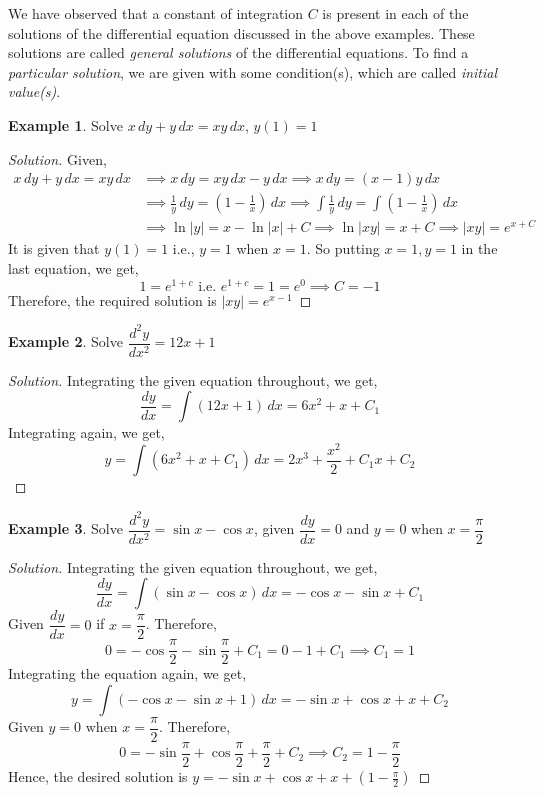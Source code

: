 \documentclass{book}
\theoremstyle{definition}
\newtheorem{example}{Example}[section]
\newenvironment{solution}
    {\begin{proof}[Solution]}
    {\end{proof}}
\begin{document}
We have observed that a constant of integration $C$ is present in each of the solutions of the differential equation discussed in the above examples. These solutions are called \textit{general solutions} of the differential equations. To find a \textit{particular solution}, we are given with some condition(s), which are called \textit{initial value(s)}.


\begin{example}
Solve $x\,dy+y\,dx=xy\,dx$, $y(1)=1$
\end{example}

\begin{solution}
Given,
\begin{align*}
    x\,dy+y\,dx=xy\,dx &\implies x\,dy=xy\,dx-y\,dx \implies x\,dy=(x-1)y\,dx \\
    &\implies \frac{1}{y}\,dy=(1-\frac{1}{x})\,dx \implies\displaystyle\int\frac{1}{y}\,dy=\displaystyle\int(1-\frac{1}{x})\,dx \\
    &\implies \ln |y|=x-\ln|x|+C \implies \ln |xy|=x+C \implies |xy|=e^{x+C}
\end{align*}    
It is given that $y(1)=1$ i.e., $y=1$ when $x=1$. So putting $x=1, y=1$ in the last equation, we get,
\[
1=e^{1+c} \text{ i.e. } e^{1+c}=1=e^0 \implies C = -1
\]
Therefore, the required solution is $|xy|=e^{x-1}$
\end{solution}



\begin{example}
Solve $\dfrac{d^2y}{dx^2}=12x+1$
\end{example}

\begin{solution}
Integrating the given equation throughout, we get,
\[
\frac{dy}{dx}=\int(12x+1)\,dx=6x^2+x+C_1
\]
Integrating again, we get, 
\[
y=\int(6x^2+x+C_1)\,dx=2x^3+\frac{x^2}{2}+C_1x+C_2
\]
\end{solution}

\begin{example}
Solve $\dfrac{d^2y}{dx^2}=\sin x-\cos x$, given $\dfrac{dy}{dx}=0$ and $y=0$ when $x=\dfrac{\pi}{2}$
\end{example}

\begin{solution}
Integrating the given equation throughout, we get,
\[
\frac{dy}{dx}=\int(\sin x-\cos x)\,dx=-\cos x-\sin x+C_1
\]
Given $\dfrac{dy}{dx}=0$ if $x=\dfrac{\pi}{2}$. Therefore, 
\[
0=-\cos \frac{\pi}{2}-\sin \frac{\pi}{2}+C_1 = 0-1+C_1 \implies C_1 = 1
\]
Integrating the equation again, we get,
\[
y=\int(-\cos x-\sin x+1)\,dx=-\sin x+\cos x+x+C_2
\]
Given $y=0 \text{ when } x = \dfrac{\pi}{2}$. Therefore,
\[
0=-\sin \frac{\pi}{2}+\cos \frac{\pi}{2}+\frac{\pi}{2}+C_2 \implies C_2=1-\frac{\pi}{2}
\]
Hence, the desired solution is $y=-\sin x+\cos x+x+(1-\frac{\pi}{2})$
\end{solution}
\end{document}

